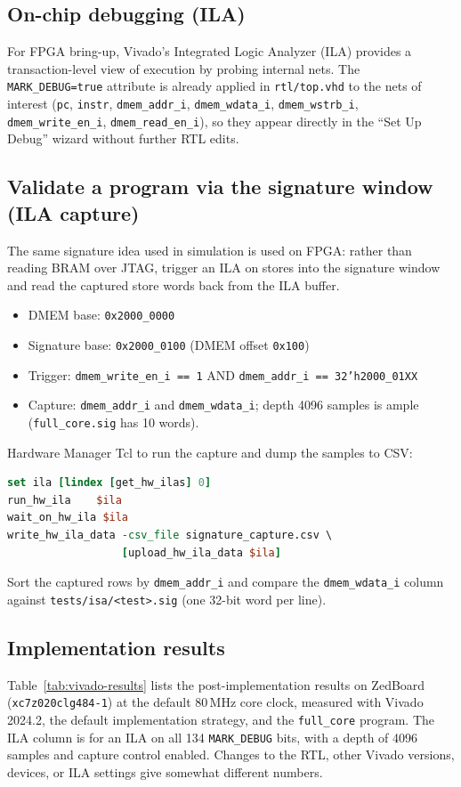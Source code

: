 \subsection{On-chip debugging (ILA)}
For FPGA bring-up, Vivado's Integrated Logic Analyzer (ILA) provides a
transaction-level view of execution by probing internal nets. The
\texttt{MARK\_DEBUG=true} attribute is already applied in \texttt{rtl/top.vhd}
to the nets of interest (\texttt{pc}, \texttt{instr}, \texttt{dmem\_addr\_i},
\texttt{dmem\_wdata\_i}, \texttt{dmem\_wstrb\_i}, \texttt{dmem\_write\_en\_i},
\texttt{dmem\_read\_en\_i}), so they appear directly in the ``Set Up Debug''
wizard without further RTL edits.

\subsection{Validate a program via the signature window (ILA capture)}
\label{sec:vivado-ila-signature}
The same signature idea used in simulation is used on FPGA: rather than reading
BRAM over JTAG, trigger an ILA on stores into the signature window and read the
captured store words back from the ILA buffer.
\begin{itemize}[leftmargin=*]
  \item DMEM base: \texttt{0x2000\_0000}
  \item Signature base: \texttt{0x2000\_0100} (DMEM offset \texttt{0x100})
  \item Trigger: \texttt{dmem\_write\_en\_i == 1} AND \texttt{dmem\_addr\_i == 32'h2000\_01XX}
  \item Capture: \texttt{dmem\_addr\_i} and \texttt{dmem\_wdata\_i}; depth 4096
        samples is ample (\texttt{full\_core.sig} has 10 words).
\end{itemize}

Hardware Manager Tcl to run the capture and dump the samples to CSV:
\begin{lstlisting}[style=minrv,language=tcl]
set ila [lindex [get_hw_ilas] 0]
run_hw_ila    $ila
wait_on_hw_ila $ila
write_hw_ila_data -csv_file signature_capture.csv \
                  [upload_hw_ila_data $ila]
\end{lstlisting}

Sort the captured rows by \texttt{dmem\_addr\_i} and compare the
\texttt{dmem\_wdata\_i} column against \texttt{tests/isa/<test>.sig} (one
32-bit word per line).

\subsection{Implementation results}
\label{sec:vivado-results}
Table~\ref{tab:vivado-results} lists the post-implementation results on
ZedBoard (\texttt{xc7z020clg484-1}) at the default 80\,MHz core clock, measured
with Vivado 2024.2, the default implementation strategy, and the
\texttt{full\_core} program. The ILA column is for an ILA on all 134
\texttt{MARK\_DEBUG} bits, with a depth of 4096 samples and capture control
enabled. Changes to the RTL, other Vivado versions, devices, or ILA settings
give somewhat different numbers.

